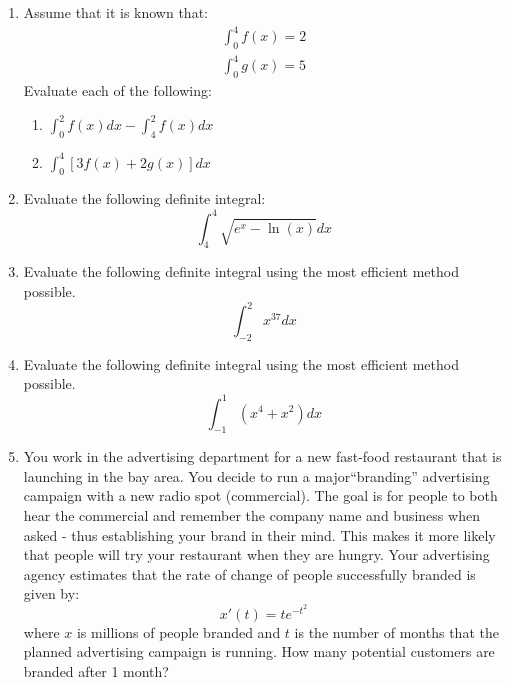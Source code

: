 \documentclass[letterpaper,12pt,fleqn]{article}
\begin{document}
\begin{enumerate}[left=0pt]
  \newpage

\item Assume that it is known that:
  \begin{gather*}
    \int_0^4 f(x)=2 \\
    \int_0^4 g(x)=5
  \end{gather*}
  Evaluate each of the following:\
  \begin{enumerate}
  \item\(\displaystyle \int_0^2 f(x)dx-\int_4^2 f(x)dx\)

    \vspace{2in}


  \item\(\displaystyle\int_0^4[3f(x)+2g(x)]dx\)

    \vspace{2in}
  \end{enumerate}
  
\item Evaluate the following definite integral:
  \[\int_{4}^{4}\sqrt{e^x-\ln(x)}dx\]

  \newpage

\item Evaluate the following definite integral using the most efficient method possible.
  \[\int_{-2}^{2}x^{37}dx\]

  \vspace{3in}

\item Evaluate the following definite integral using the most efficient method possible.
  \[\int_{-1}^{1}(x^4+x^2)dx\]

  \newpage

\item You work in the advertising department for a new fast-food restaurant that is launching in the bay area.  You
  decide to run a major``branding'' advertising campaign with a new radio spot (commercial).  The goal is for
  people to both hear the commercial and remember the company name and business when asked - thus establishing your
  brand in their mind.  This makes it more likely that people will try your restaurant when they are hungry.  Your
  advertising agency estimates that the rate of change of people successfully branded is given by:
  \[x'(t)=te^{-t^2}\]
  where \(x\) is millions of people branded and \(t\) is the number of months that the planned advertising campaign
  is running.  How many potential customers are branded after 1 month?

  \newpage
  

\end{enumerate}
\end{document}
